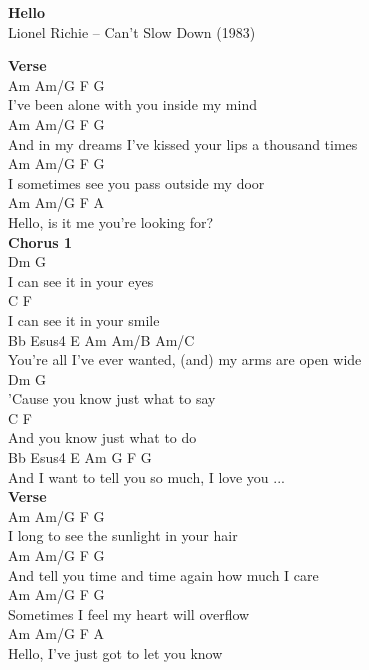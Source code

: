 \documentclass[a4paper]{article}
\begin{document}
    \begin{center}
        \textbf{Hello}
        ~\\
        Lionel Richie -- Can't Slow Down (1983)
    \end{center}
    {
        \scriptsize
        \textbf{Verse}
        ~\\
        {
            \cutive
            \obeyspaces
     Am              Am/G            F    G
\\
I've been alone with you inside my mind 
\\
    Am                 Am/G             F      G
\\
And in my dreams I've kissed your lips a thousand times 
\\
  Am                 Am/G              F    G
\\
I sometimes see you pass outside my door 
\\
Am   Am/G    F                  A
\\
Hello, is it me you're looking for? 
\\

        }
        \textbf{Chorus 1}
        ~\\
        {
            \cutive
            \obeyspaces
      Dm              G
\\
I can see it in your eyes 
\\
      C               F
\\
I can see it in your smile 
\\
       Bb           Esus4 E            Am    Am/B   Am/C
\\
You're all I've ever wanted, (and) my arms are open wide 
\\
       Dm                      G
\\
'Cause you know just what to say 
\\
        C                  F
\\
And you know just what to do 
\\
      Bb                Esus4  E      Am  G  F  G
\\
And I want to tell you so much, I love you ... 
\\

        }
        \textbf{Verse}
        ~\\
        {
            \cutive
            \obeyspaces
     Am              Am/G            F    G
\\
I long to see the sunlight in your hair 
\\
    Am                 Am/G             F      G
\\
And tell you time and time again how much I care 
\\
  Am                 Am/G              F    G
\\
Sometimes I feel my heart will overflow 
\\
Am  Am/G        F               A
\\
Hello, I've just got to let you know 
\\

}}
\end{document}
